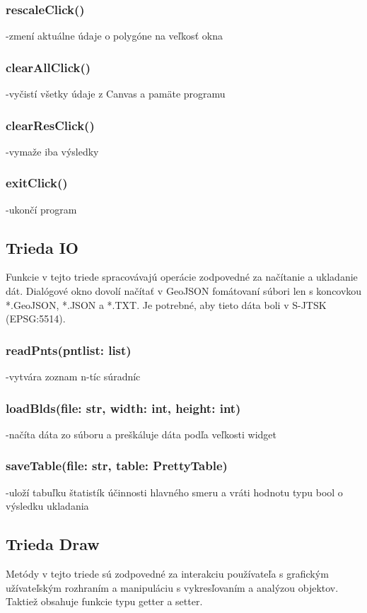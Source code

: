 \documentclass[12pt]{article}
\begin{document}
\subsubsection*{rescaleClick()}
\noindent-zmení aktuálne údaje o polygóne na veľkosť okna
\subsubsection*{clearAllClick()}
\noindent-vyčistí všetky údaje z Canvas a pamäte programu
\subsubsection*{clearResClick()}
\noindent-vymaže iba výsledky
\subsubsection*{exitClick()}
\noindent-ukončí program
\subsection*{Trieda IO}
Funkcie v tejto triede spracovávajú operácie zodpovedné za načítanie a ukladanie dát. Dialógové okno dovolí načítať v GeoJSON fomátovaní súbori len s koncovkou *.GeoJSON, *.JSON a *.TXT. Je potrebné, aby tieto dáta boli v S-JTSK (EPSG:5514). 
\subsubsection*{readPnts(pnt\textunderscore list: list)}
\noindent-vytvára zoznam n-tíc súradníc
\subsubsection*{loadBlds(file: str, width: int, height: int)}
\noindent-načíta dáta zo súboru a preškáluje dáta podľa veľkosti widget
\subsubsection*{saveTable(file: str, table: PrettyTable)}
\noindent-uloží tabuľku štatistík účinnosti hlavného smeru a vráti hodnotu typu bool o výsledku ukladania
\subsection*{Trieda Draw}
Metódy v tejto triede sú zodpovedné za interakciu používateľa s grafickým užívateľským rozhraním a manipuláciu s vykresľovaním a analýzou objektov. Taktiež obsahuje funkcie typu getter a setter.
\end{document}
